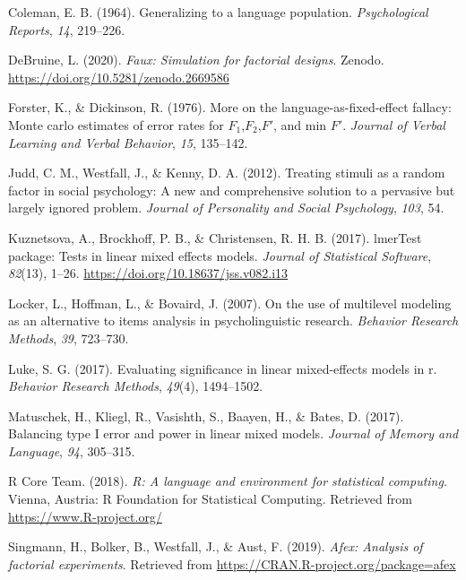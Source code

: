 \documentclass[
  english,
  doc,floatsintext]{apa6}
\begin{document}
\leavevmode\hypertarget{ref-coleman_1964}{}%
Coleman, E. B. (1964). Generalizing to a language population. \emph{Psychological Reports}, \emph{14}, 219--226.

\leavevmode\hypertarget{ref-R-faux}{}%
DeBruine, L. (2020). \emph{Faux: Simulation for factorial designs}. Zenodo. \url{https://doi.org/10.5281/zenodo.2669586}

\leavevmode\hypertarget{ref-forster_dickinson_1976}{}%
Forster, K., \& Dickinson, R. (1976). More on the language-as-fixed-effect fallacy: Monte carlo estimates of error rates for \(F_1\),\(F_2\),\(F'\), and min \(F'\). \emph{Journal of Verbal Learning and Verbal Behavior}, \emph{15}, 135--142.

\leavevmode\hypertarget{ref-judd_westfall_kenny_2012}{}%
Judd, C. M., Westfall, J., \& Kenny, D. A. (2012). Treating stimuli as a random factor in social psychology: A new and comprehensive solution to a pervasive but largely ignored problem. \emph{Journal of Personality and Social Psychology}, \emph{103}, 54.

\leavevmode\hypertarget{ref-R-lmerTest}{}%
Kuznetsova, A., Brockhoff, P. B., \& Christensen, R. H. B. (2017). lmerTest package: Tests in linear mixed effects models. \emph{Journal of Statistical Software}, \emph{82}(13), 1--26. \url{https://doi.org/10.18637/jss.v082.i13}

\leavevmode\hypertarget{ref-locker_hoffman_bovaird_2007}{}%
Locker, L., Hoffman, L., \& Bovaird, J. (2007). On the use of multilevel modeling as an alternative to items analysis in psycholinguistic research. \emph{Behavior Research Methods}, \emph{39}, 723--730.

\leavevmode\hypertarget{ref-luke-2017}{}%
Luke, S. G. (2017). Evaluating significance in linear mixed-effects models in r. \emph{Behavior Research Methods}, \emph{49}(4), 1494--1502.

\leavevmode\hypertarget{ref-matuschek_et_al_2017}{}%
Matuschek, H., Kliegl, R., Vasishth, S., Baayen, H., \& Bates, D. (2017). Balancing type I error and power in linear mixed models. \emph{Journal of Memory and Language}, \emph{94}, 305--315.

\leavevmode\hypertarget{ref-R-base}{}%
R Core Team. (2018). \emph{R: A language and environment for statistical computing}. Vienna, Austria: R Foundation for Statistical Computing. Retrieved from \url{https://www.R-project.org/}

\leavevmode\hypertarget{ref-R-afex}{}%
Singmann, H., Bolker, B., Westfall, J., \& Aust, F. (2019). \emph{Afex: Analysis of factorial experiments}. Retrieved from \url{https://CRAN.R-project.org/package=afex}
\end{document}
